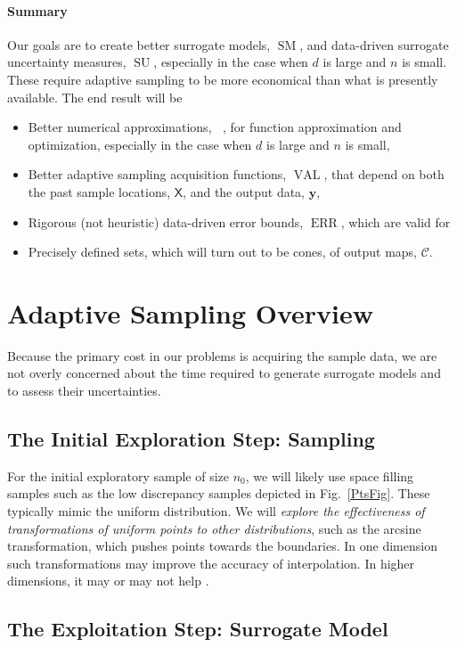\documentclass[11pt]{NSFamsart}
\DeclareMathOperator{\QOI}{QOI} %
\DeclareMathOperator{\APP}{\widehat{\QOI}}
\DeclareMathOperator{\SURR}{SM} %
\DeclareMathOperator{\ERR}{ERR}
\DeclareMathOperator{\VAL}{VAL}
\DeclareMathOperator{\SURRERR}{SU}
\newcommand{\mX}{\mathsf{X}}
\newcommand{\by}{{\boldsymbol{y}}}
\newcommand{\calc}{{\mathcal{C}}}
\begin{document}
\paragraph*{Summary} 
Our goals are to create better surrogate models, $\SURR$, and data-driven surrogate uncertainty measures, $\SURRERR$, especially in the case when $d$ is large and $n$ is small.  These require adaptive sampling to be more economical than what is presently available.  The end result will be
\begin{itemize}
    \item Better numerical approximations, $\APP$, for function approximation and optimization, especially in the case when $d$ is large and $n$ is small, 
    \item Better adaptive sampling acquisition functions, $\VAL$, that depend on both the past sample locations, $\mX$, and the output data, $\by$,
    \item Rigorous (not heuristic) data-driven error bounds, $\ERR$, which are valid for
    \item Precisely defined sets, which will turn out to be cones, of output maps, $\calc$.
\end{itemize}

\section{Adaptive Sampling Overview}

Because the primary  cost in our problems is acquiring the sample data, we are not overly concerned about the time required to generate surrogate models and to assess their uncertainties.


\subsection{The Initial Exploration Step: Sampling}

For the initial exploratory sample of size $n_0$, we will likely use space filling samples such as the low discrepancy samples depicted in Fig.\ \ref{PtsFig}.  These typically mimic the uniform distribution.  We will \emph{explore the effectiveness of transformations of uniform points to other distributions}, such as the arcsine transformation, which pushes points towards the boundaries.  In one dimension such transformations may improve the accuracy of interpolation.  In higher dimensions, it may or may not help \cite{HicLi12a}.

\subsection{The Exploitation Step:  Surrogate Model}
\end{document}
